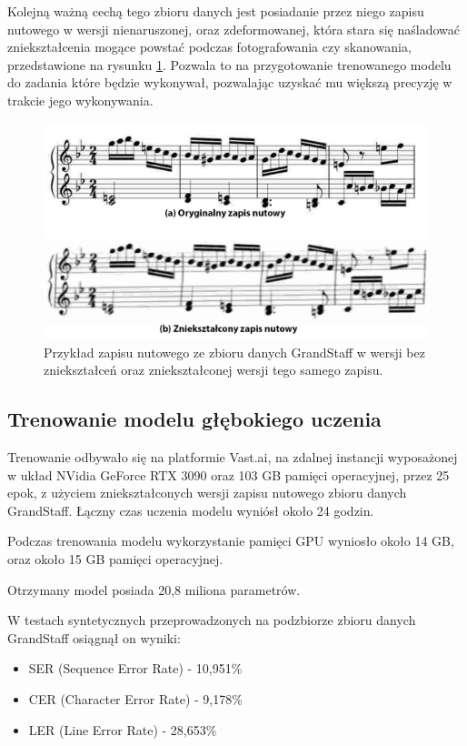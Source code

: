 Kolejną ważną cechą tego zbioru danych jest posiadanie przez niego zapisu nutowego w wersji nienaruszonej, oraz zdeformowanej, która stara się naśladować zniekształcenia mogące powstać podczas fotografowania czy skanowania, przedstawione na rysunku \ref{fig:GS-normal-distorted}. Pozwala to na przygotowanie trenowanego modelu do zadania które będzie wykonywał, pozwalając uzyskać mu większą precyzję w trakcie jego wykonywania.

\begin{figure}[ht]
	\centering
	\includegraphics[width=14cm]{images/normal-distorted-GS}
	\caption{Przykład zapisu nutowego ze zbioru danych GrandStaff w wersji bez zniekształceń oraz zniekształconej wersji tego samego zapisu.}
	\label{fig:GS-normal-distorted}
\end{figure}

\subsection{Trenowanie modelu głębokiego uczenia} \label{ModelTraining}

Trenowanie odbywało się na platformie Vast.ai, na zdalnej instancji wyposażonej w układ NVidia GeForce RTX 3090 oraz 103 GB pamięci operacyjnej, przez 25 epok, z użyciem zniekształconych wersji zapisu nutowego zbioru danych GrandStaff. Łączny czas uczenia modelu wyniósł około 24 godzin.

Podczas trenowania modelu wykorzystanie pamięci GPU wyniosło około 14 GB, oraz około 15 GB pamięci operacyjnej.

Otrzymany model posiada 20,8 miliona parametrów.

W testach syntetycznych przeprowadzonych na podzbiorze zbioru danych GrandStaff osiągnął on wyniki:
\begin{itemize}
	\item SER (Sequence Error Rate) - 10,951\%
	\item CER (Character Error Rate) - 9,178\%
	\item LER (Line Error Rate) - 28,653\%
\end{itemize}

